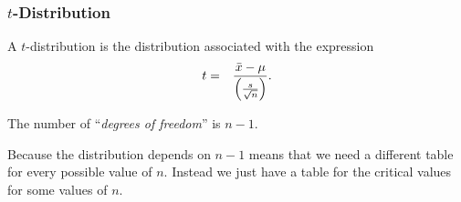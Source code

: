 \begin{frame}
  \frametitle{$t$-Distribution}

  \begin{definition}[$t$-Distribution]

    A $t$-distribution is the distribution associated with the expression
    \begin{eqnarray*}
      t &  = & \frac{\bar{x}-\mu}{\left( \frac{s}{\sqrt{n}} \right)}.
    \end{eqnarray*}

    The number of ``\textit{degrees of freedom}'' is $n-1$.
    
  \end{definition}

  Because the distribution depends on $n-1$ means that we need a
  different table for every possible value of $n$. Instead we just
  have a table for the critical values for some values of $n$.
  

\end{frame}


